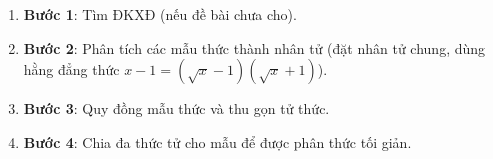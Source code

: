 \begin{enumerate}
\item \textbf{Bước 1}: Tìm ĐKXĐ (nếu đề bài chưa cho).
\item \textbf{Bước 2}: Phân tích các mẫu thức thành nhân tử (đặt nhân tử chung, dùng hằng đẳng thức $x - 1 = (\sqrt{x}-1)(\sqrt{x}+1)$).
\item \textbf{Bước 3}: Quy đồng mẫu thức và thu gọn tử thức.
\item \textbf{Bước 4}: Chia đa thức tử cho mẫu để được phân thức tối giản.
\end{enumerate}

